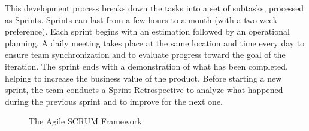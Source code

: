 This development process breaks down the tasks into a set of subtasks, processed as Sprints. Sprints can last from a few hours to a month (with a two-week preference). Each sprint begins with an estimation followed by an operational planning. A daily meeting takes place at the same location and time every day to ensure team synchronization and to evaluate progress toward the goal of the iteration. The sprint ends with a demonstration of what has been completed, helping to increase the business value of the product. Before starting a new sprint, the team conducts a Sprint Retrospective to analyze what happened during the previous sprint and to improve for the next one.

\begin{figure}[H]
    \centering
    \caption{ The Agile SCRUM Framework \cite{agile-scrum-lean}}
    \label{fig:Scrum_Methodology_Diagram}
\end{figure}


